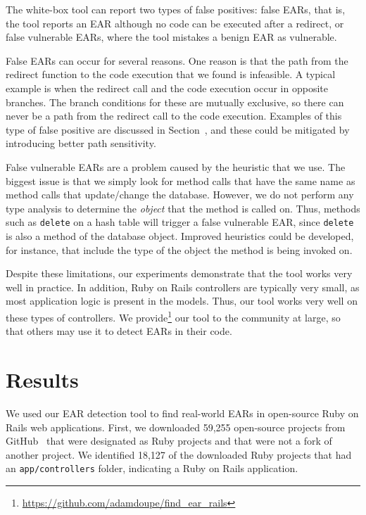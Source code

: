 The white-box tool can report two types of false positives: false
EARs, that is, the tool reports an EAR although no code can be
executed after a redirect, or false vulnerable EARs, where the tool
mistakes a benign EAR as vulnerable.

False EARs can occur for several reasons. One reason is that the path from
the redirect function to the code execution that we found is infeasible. A
typical example is when the redirect call and the code execution occur in
opposite branches. The branch conditions for these are mutually exclusive,
so there can never be a path from the redirect call to the code execution.
Examples of this type of false positive are discussed in
Section~, and these could be mitigated by introducing
better path sensitivity.




False vulnerable EARs are a problem caused by the heuristic that we use.
The biggest issue is that we simply look for method calls that have
the same name as method calls that update/change the database.
However, we do not perform any type analysis to determine the
\emph{object} that the method is called on. Thus, methods such as
\texttt{delete} on a hash table will trigger a false vulnerable EAR,
since \texttt{delete} is also a method of the database object.
Improved heuristics could be developed, for instance, that include the
type of the object the method is being invoked on.

Despite these limitations, our experiments demonstrate that the tool
works very well in practice. In addition, Ruby on Rails controllers
are typically very small, as most application logic is present in the
models. Thus, our tool works very well on these types of controllers.
We
provide\footnote{\url{https://github.com/adamdoupe/find\_ear\_rails}}
our tool to the community at large, so that others may use it to
detect EARs in their code.


\section{Results}

We used our EAR detection tool to find real-world EARs in open-source Ruby
on Rails web applications. First, we downloaded 59,255 open-source projects
from GitHub~\cite{github} that were designated as Ruby projects and that
were not a fork of another project. We identified 18,127 of the downloaded
Ruby projects that had an \texttt{app/controllers} folder, indicating a
Ruby on Rails application.


